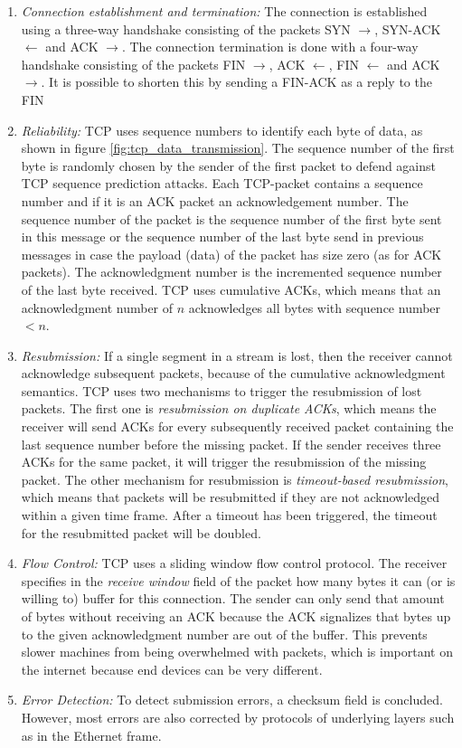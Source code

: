 \begin{enumerate}
      \item \textit{Connection establishment and termination:} The connection is established using a three-way handshake consisting of the packets SYN $\rightarrow$, SYN-ACK $\leftarrow$ and ACK $\rightarrow$. The connection termination is done with a four-way handshake consisting of the packets FIN $\rightarrow$, ACK $\leftarrow$, FIN $\leftarrow$ and ACK $\rightarrow$. It is possible to shorten this by sending a FIN-ACK as a reply to the FIN
      \item \textit{Reliability:} \ac{TCP} uses sequence numbers to identify each byte of data, as shown in figure \ref{fig:tcp_data_transmission}. The sequence number of the first byte is randomly chosen by the sender of the first packet to defend against TCP sequence prediction attacks. Each \ac{TCP}-packet contains a sequence number and \textendash{} if it is an ACK packet \textendash{} an acknowledgement number. The sequence number of the packet is the sequence number of the first byte sent in this message or the sequence number of the last byte send in previous messages in case the payload (data) of the packet has size zero (as for ACK packets). The acknowledgment number is the incremented sequence number of the last byte received. TCP uses cumulative ACKs, which means that an acknowledgment number of $n$ acknowledges all bytes with sequence number $< n$.
      \item \textit{Resubmission:} If a single segment in a stream is lost, then the receiver cannot acknowledge subsequent packets, because of the cumulative acknowledgment semantics. TCP uses two mechanisms to trigger the resubmission of lost packets. The first one is \textit{resubmission on duplicate ACKs}, which means the receiver will send ACKs for every subsequently received packet containing the last sequence number before the missing packet. If the sender receives three ACKs for the same packet, it will trigger the resubmission of the missing packet. The other mechanism for resubmission is \textit{timeout-based resubmission}, which means that packets will be resubmitted if they are not acknowledged within a given time frame. After a timeout has been triggered, the timeout for the resubmitted packet will be doubled.
      \item \textit{Flow Control:} \ac{TCP} uses a sliding window flow control protocol. The receiver specifies in the \textit{receive window} field of the packet how many bytes it can (or is willing to) buffer for this connection. The sender can only send that amount of bytes without receiving an ACK because the ACK signalizes that bytes up to the given acknowledgment number are out of the buffer. This prevents slower machines from being overwhelmed with packets, which is important on the internet because end devices can be very different.
      \item \textit{Error Detection:} To detect submission errors, a checksum field is concluded. However, most errors are also corrected by protocols of underlying layers such as in the Ethernet frame.
\end{enumerate}

